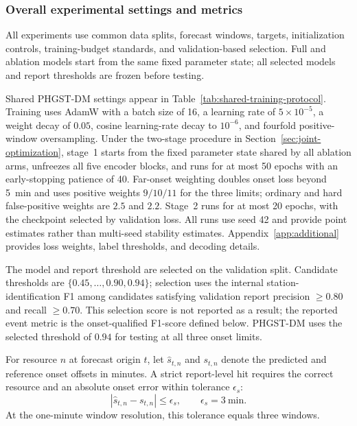 \documentclass[a4paper,fleqn]{cas-dc}
\begin{document}
\subsubsection{Overall experimental settings and metrics}

All experiments use common data splits, forecast windows, targets, initialization controls, training-budget standards, and validation-based selection. Full and ablation models start from the same fixed parameter state; all selected models and report thresholds are frozen before testing.


Shared PHGST-DM settings appear in Table~\ref{tab:shared-training-protocol}. Training uses AdamW with a batch size of 16, a learning rate of $5\times10^{-5}$, a weight decay of $0.05$, cosine learning-rate decay to $10^{-6}$, and fourfold positive-window oversampling. Under the two-stage procedure in Section~\ref{sec:joint-optimization}, stage~1 starts from the fixed parameter state shared by all ablation arms, unfreezes all five encoder blocks, and runs for at most 50 epochs with an early-stopping patience of 40. Far-onset weighting doubles onset loss beyond 5~min and uses positive weights $9/10/11$ for the three limits; ordinary and hard false-positive weights are $2.5$ and $2.2$. Stage~2 runs for at most 20 epochs, with the checkpoint selected by validation loss. All runs use seed 42 and provide point estimates rather than multi-seed stability estimates. Appendix~\ref{app:additional} provides loss weights, label thresholds, and decoding details.

The model and report threshold are selected on the validation split. Candidate thresholds are $\{0.45,\dots,0.90,0.94\}$; selection uses the internal station-identification F1 among candidates satisfying validation report precision $\geq0.80$ and recall $\geq0.70$. This selection score is not reported as a result; the reported event metric is the onset-qualified F1-score defined below. PHGST-DM uses the selected threshold of $0.94$ for testing at all three onset limits.

For resource $n$ at forecast origin $t$, let $\hat s_{t,n}$ and $s_{t,n}$ denote the predicted and reference onset offsets in minutes. A strict report-level hit requires the correct resource and an absolute onset error within tolerance $\epsilon_s$:
\begin{equation}
|\hat{s}_{t,n}-s_{t,n}|\leq\epsilon_s,\qquad
\epsilon_s=3~\mathrm{min}.
\end{equation}
At the one-minute window resolution, this tolerance equals three windows.
\end{document}
